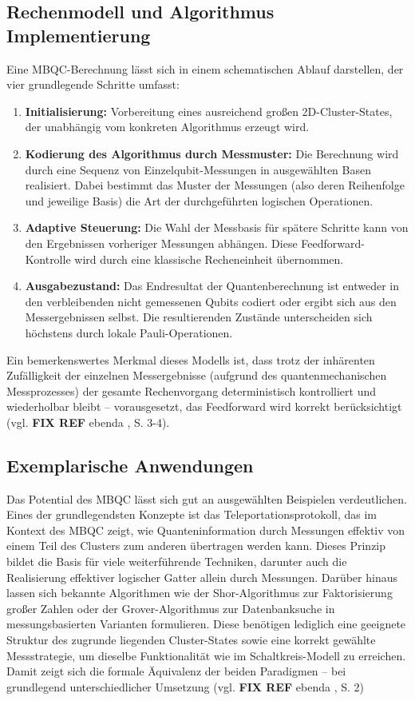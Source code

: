 \subsection*{Rechenmodell und Algorithmus Implementierung}
Eine MBQC-Berechnung lässt sich in einem schematischen Ablauf darstellen, der vier grundlegende Schritte umfasst:
\begin{enumerate}
    \item \textbf{Initialisierung:} Vorbereitung eines ausreichend großen 2D-Cluster-States, der unabhängig vom konkreten Algorithmus erzeugt wird.
    \item \textbf{Kodierung des Algorithmus durch Messmuster:} Die Berechnung wird durch eine Sequenz von Einzelqubit-Messungen in ausgewählten Basen realisiert. Dabei bestimmt das Muster der Messungen (also deren Reihenfolge und jeweilige Basis) die Art der durchgeführten logischen Operationen.
    \item \textbf{Adaptive Steuerung:} Die Wahl der Messbasis für spätere Schritte kann von den Ergebnissen vorheriger Messungen abhängen. Diese Feedforward-Kontrolle wird durch eine klassische Recheneinheit übernommen.
    \item \textbf{Ausgabezustand:} Das Endresultat der Quantenberechnung ist entweder in den verbleibenden nicht gemessenen Qubits codiert oder ergibt sich aus den Messergebnissen selbst. Die resultierenden Zustände unterscheiden sich höchstens durch lokale Pauli-Operationen.
\end{enumerate}
Ein bemerkenswertes Merkmal dieses Modells ist, dass trotz der inhärenten Zufälligkeit der einzelnen Messergebnisse (aufgrund des quantenmechanischen Messprozesses) der gesamte Rechenvorgang deterministisch kontrolliert und wiederholbar bleibt – vorausgesetzt, das Feedforward wird korrekt berücksichtigt (vgl. \textbf{FIX REF} ebenda \citeyear{h_j_briegel_measurement-based_2009}, S. 3-4).
\subsection*{Exemplarische Anwendungen}
Das Potential des MBQC lässt sich gut an ausgewählten Beispielen verdeutlichen. Eines der grundlegendsten Konzepte ist das Teleportationsprotokoll, das im Kontext des MBQC zeigt, wie Quanteninformation durch Messungen effektiv von einem Teil des Clusters zum anderen übertragen werden kann. Dieses Prinzip bildet die Basis für viele weiterführende Techniken, darunter auch die Realisierung effektiver logischer Gatter allein durch Messungen.
Darüber hinaus lassen sich bekannte Algorithmen wie der Shor-Algorithmus zur Faktorisierung großer Zahlen oder der Grover-Algorithmus zur Datenbanksuche in messungsbasierten Varianten formulieren. Diese benötigen lediglich eine geeignete Struktur des zugrunde liegenden Cluster-States sowie eine korrekt gewählte Messstrategie, um dieselbe Funktionalität wie im Schaltkreis-Modell zu erreichen. Damit zeigt sich die formale Äquivalenz der beiden Paradigmen – bei grundlegend unterschiedlicher Umsetzung (vgl. \textbf{FIX REF} ebenda \citeyear{h_j_briegel_measurement-based_2009}, S. 2)


